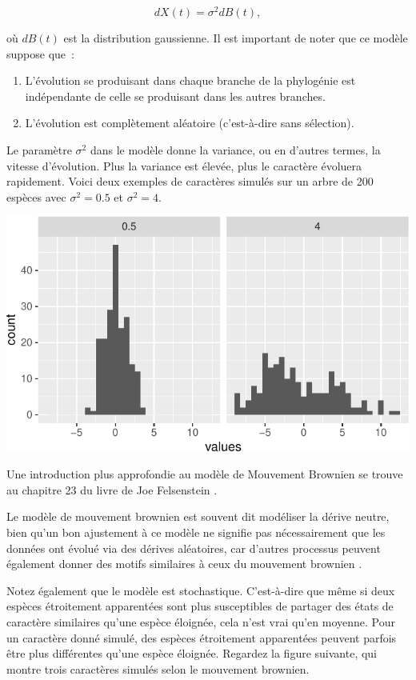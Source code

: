 \documentclass[
]{book}
\providecommand{\tightlist}{%
  \setlength{\itemsep}{0pt}\setlength{\parskip}{0pt}}
\begin{document}
\[dX(t)=\sigma^2 dB(t),\]

où \(dB(t)\) est la distribution gaussienne. Il est important de noter que ce modèle suppose que~:

\begin{enumerate}
\def\labelenumi{\arabic{enumi}.}
\tightlist
\item
  L'évolution se produisant dans chaque branche de la phylogénie est indépendante de celle se produisant dans les autres branches.
\item
  L'évolution est complètement aléatoire (c'est-à-dire sans sélection).
\end{enumerate}

Le paramètre \(\sigma^2\) dans le modèle donne la variance, ou en d'autres termes, la vitesse d'évolution. Plus la variance est élevée, plus le caractère évoluera rapidement. Voici deux exemples de caractères simulés sur un arbre de 200 espèces avec \(\sigma^2=0.5\) et \(\sigma^2=4\).

\begin{center}\includegraphics{pcm-workshop_files/figure-latex/BM_Model_SigmaExample-1} \end{center}

Une introduction plus approfondie au modèle de Mouvement Brownien se trouve au chapitre 23 du livre de Joe Felsenstein \citep{felsenstein2004inferring}.

Le modèle de mouvement brownien est souvent dit modéliser la dérive neutre, bien qu'un bon ajustement à ce modèle ne signifie pas nécessairement que les données ont évolué via des dérives aléatoires, car d'autres processus peuvent également donner des motifs similaires à ceux du mouvement brownien \citep{hansen1996translating}.

Notez également que le modèle est stochastique. C'est-à-dire que même si deux espèces étroitement apparentées sont plus susceptibles de partager des états de caractère similaires qu'une espèce éloignée, cela n'est vrai qu'en moyenne. Pour un caractère donné simulé, des espèces étroitement apparentées peuvent parfois être plus différentes qu'une espèce éloignée. Regardez la figure suivante, qui montre trois caractères simulés selon le mouvement brownien.
\end{document}
